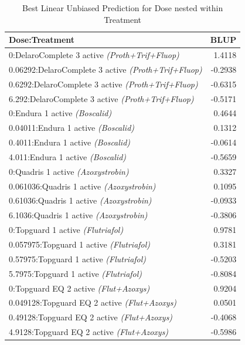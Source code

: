 \documentclass[
  10pt,
  letterpaper,
  twocolumn]{article}
\begin{document}
\begin{table}[ht]
\centering
\small
\caption{Best Linear Unbiased Prediction for Dose nested within Treatment}
\renewcommand{\arraystretch}{1.2}
\begin{tabular}{|p{7.0cm}|r|}
\hline
\textbf{Dose:Treatment} & \textbf{BLUP} \\
\hline
0:DelaroComplete 3 active \textit{(Proth+Trif+Fluop)} & 1.4118 \\
0.06292:DelaroComplete 3 active \textit{(Proth+Trif+Fluop)} & -0.2938 \\
0.6292:DelaroComplete 3 active \textit{(Proth+Trif+Fluop)} & -0.6315 \\
6.292:DelaroComplete 3 active \textit{(Proth+Trif+Fluop)} & -0.5171 \\
0:Endura 1 active \textit{(Boscalid)} & 0.4644 \\
0.04011:Endura 1 active \textit{(Boscalid)} & 0.1312 \\
0.4011:Endura 1 active \textit{(Boscalid)} & -0.0614 \\
4.011:Endura 1 active \textit{(Boscalid)} & -0.5659 \\
0:Quadris 1 active \textit{(Azoxystrobin)} & 0.3327 \\
0.061036:Quadris 1 active \textit{(Azoxystrobin)} & 0.1095 \\
0.61036:Quadris 1 active \textit{(Azoxystrobin)} & -0.0933 \\
6.1036:Quadris 1 active \textit{(Azoxystrobin)} & -0.3806 \\
0:Topguard 1 active \textit{(Flutriafol)} & 0.9781 \\
0.057975:Topguard 1 active \textit{(Flutriafol)} & 0.3181 \\
0.57975:Topguard 1 active \textit{(Flutriafol)} & -0.5203 \\
5.7975:Topguard 1 active \textit{(Flutriafol)} & -0.8084 \\
0:Topguard EQ 2 active \textit{(Flut+Azoxys)} & 0.9204 \\
0.049128:Topguard EQ 2 active \textit{(Flut+Azoxys)} & 0.0501 \\
0.49128:Topguard EQ 2 active \textit{(Flut+Azoxys)} & -0.4068 \\
4.9128:Topguard EQ 2 active \textit{(Flut+Azoxys)} & -0.5986 \\
\hline
\end{tabular}
\end{table}
\end{document}
